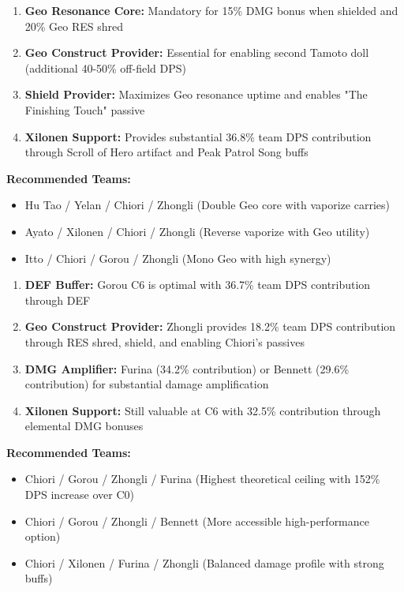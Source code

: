 \documentclass[12pt,a4paper]{article}
\begin{document}
\begin{tcolorbox}[colback=c0color!5, colframe=c0color, title=C0 Sub-DPS Optimal Team Structure]
\begin{enumerate}
    \item \textbf{Geo Resonance Core:} Mandatory for 15\% DMG bonus when shielded and 20\% Geo RES shred
    \item \textbf{Geo Construct Provider:} Essential for enabling second Tamoto doll (additional 40-50\% off-field DPS)
    \item \textbf{Shield Provider:} Maximizes Geo resonance uptime and enables "The Finishing Touch" passive
    \item \textbf{Xilonen Support:} Provides substantial 36.8\% team DPS contribution through Scroll of Hero artifact and Peak Patrol Song buffs
\end{enumerate}

\textbf{Recommended Teams:}
\begin{itemize}
    \item Hu Tao / Yelan / Chiori / Zhongli (Double Geo core with vaporize carries)
    \item Ayato / Xilonen / Chiori / Zhongli (Reverse vaporize with Geo utility)
    \item Itto / Chiori / Gorou / Zhongli (Mono Geo with high synergy)
\end{itemize}
\end{tcolorbox}

\begin{tcolorbox}[colback=c6color!5, colframe=c6color, title=C6 Main DPS Optimal Team Structure]
\begin{enumerate}
    \item \textbf{DEF Buffer:} Gorou C6 is optimal with 36.7\% team DPS contribution through DEF%
    \item \textbf{Geo Construct Provider:} Zhongli provides 18.2\% team DPS contribution through RES shred, shield, and enabling Chiori's passives
    \item \textbf{DMG Amplifier:} Furina (34.2\% contribution) or Bennett (29.6\% contribution) for substantial damage amplification
    \item \textbf{Xilonen Support:} Still valuable at C6 with 32.5\% contribution through elemental DMG bonuses
\end{enumerate}

\textbf{Recommended Teams:}
\begin{itemize}
    \item Chiori / Gorou / Zhongli / Furina (Highest theoretical ceiling with 152\% DPS increase over C0)
    \item Chiori / Gorou / Zhongli / Bennett (More accessible high-performance option)
    \item Chiori / Xilonen / Furina / Zhongli (Balanced damage profile with strong buffs)
\end{itemize}
\end{tcolorbox}
\end{document}
